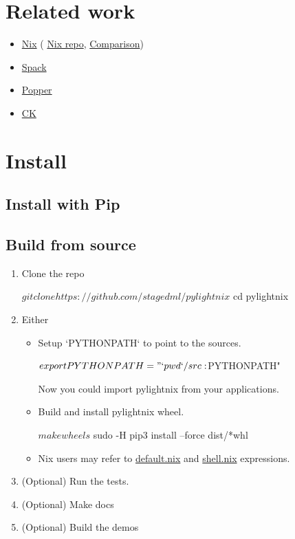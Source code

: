 \documentclass{article}
\begin{document}
\section{Related work}

\begin{itemize}
  \item \href{https://nixos.org}{Nix} (
    \href{https://github.com/nixos/nix}{Nix repo},
    \href{./Comparison.md#Pylightnix-vs-Nix}{Comparison})
  \item \href{https://spack.io}{Spack}
  \item \href{https://falsifiable.us}{Popper}
  \item \href{https://cknowledge.org}{CK}
\end{itemize}

\section{Install}

\subsection{Install with Pip}


\subsection{Build from source}

\begin{enumerate}
\item Clone the repo
  \begin{shellcode}
  $ git clone https://github.com/stagedml/pylightnix
  $ cd pylightnix
  \end{shellcode}
\item Either
  \begin{itemize}
    \item Setup `PYTHONPATH` to point to the sources.
      \begin{shellcode}
      $ export PYTHONPATH="`pwd`/src:$PYTHONPATH"
      \end{shellcode}
      Now you could import pylightnix from your applications.
    \item Build and install pylightnix wheel.
      \begin{shellcode}
       $ make wheels
       $ sudo -H pip3 install --force dist/*whl
      \end{shellcode}
    \item Nix users may refer to \href{../default.nix}{default.nix} and
      \href{../shell.nix}{shell.nix} expressions.
  \end{itemize}
\item (Optional) Run the tests.
\item (Optional) Make docs
\item (Optional) Build the demos
\end{enumerate}
\end{document}
